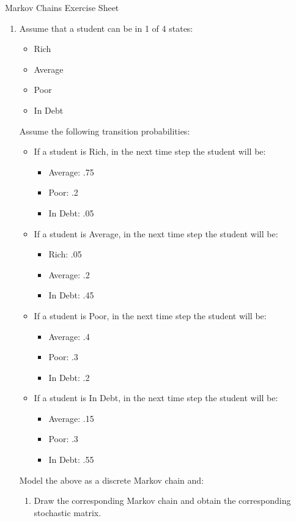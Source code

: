 \documentclass[12pt]{article}
\begin{document}
\begin{center}
\Huge{Markov Chains Exercise Sheet}\\
\date{\tiny{Last updated: \today.}}
\end{center}

\begin{enumerate}
\item Assume that a student can be in 1 of 4 states:
\begin{itemize}
	\item Rich
	\item Average
	\item Poor
	\item In Debt
\end{itemize}
Assume the following transition probabilities:

\begin{itemize}
	\item If a student is Rich, in the next time step the student will be:
	\begin{itemize}
		\item Average: .75
		\item Poor: .2
		\item In Debt: .05
	\end{itemize}
	\item If a student is Average, in the next time step the student will be:
	\begin{itemize}
		\item Rich: .05
		\item Average: .2
		\item In Debt: .45
	\end{itemize}
	\item If a student is Poor, in the next time step the student will be:
	\begin{itemize}
		\item Average: .4
		\item Poor: .3
		\item In Debt: .2
	\end{itemize}
	\item If a student is In Debt, in the next time step the student will be:
	\begin{itemize}
		\item Average: .15
		\item Poor: .3
		\item In Debt: .55
	\end{itemize}
\end{itemize}Model the above as a discrete Markov chain and:
\begin{enumerate}
	\item Draw the corresponding Markov chain and obtain the corresponding stochastic matrix.


\end{enumerate}
\end{enumerate}
\end{document}
